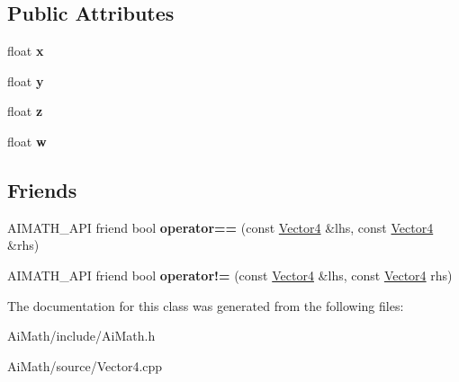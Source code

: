 \subsection*{Public Attributes}
\begin{DoxyCompactItemize}
\item 
\hypertarget{class_ai_math_1_1_vector4_a518497574690c3511c77a9876e179d61}{float {\bfseries x}}\label{class_ai_math_1_1_vector4_a518497574690c3511c77a9876e179d61}

\item 
\hypertarget{class_ai_math_1_1_vector4_ac81198522c850d38d7f765459298ee59}{float {\bfseries y}}\label{class_ai_math_1_1_vector4_ac81198522c850d38d7f765459298ee59}

\item 
\hypertarget{class_ai_math_1_1_vector4_a3e4d29e783b466fec6081c59bee82b3d}{float {\bfseries z}}\label{class_ai_math_1_1_vector4_a3e4d29e783b466fec6081c59bee82b3d}

\item 
\hypertarget{class_ai_math_1_1_vector4_a728127f284281d1fd39a31ff6dba910d}{float {\bfseries w}}\label{class_ai_math_1_1_vector4_a728127f284281d1fd39a31ff6dba910d}

\end{DoxyCompactItemize}
\subsection*{Friends}
\begin{DoxyCompactItemize}
\item 
\hypertarget{class_ai_math_1_1_vector4_a25984ac1dbdff4ae0bca4a990069f911}{A\+I\+M\+A\+T\+H\+\_\+\+A\+P\+I friend bool {\bfseries operator==} (const \hyperlink{class_ai_math_1_1_vector4}{Vector4} \&lhs, const \hyperlink{class_ai_math_1_1_vector4}{Vector4} \&rhs)}\label{class_ai_math_1_1_vector4_a25984ac1dbdff4ae0bca4a990069f911}

\item 
\hypertarget{class_ai_math_1_1_vector4_a5088c44c5df3d2a3a98f484e3b860c0a}{A\+I\+M\+A\+T\+H\+\_\+\+A\+P\+I friend bool {\bfseries operator!=} (const \hyperlink{class_ai_math_1_1_vector4}{Vector4} \&lhs, const \hyperlink{class_ai_math_1_1_vector4}{Vector4} rhs)}\label{class_ai_math_1_1_vector4_a5088c44c5df3d2a3a98f484e3b860c0a}

\end{DoxyCompactItemize}


The documentation for this class was generated from the following files\+:\begin{DoxyCompactItemize}
\item 
Ai\+Math/include/Ai\+Math.\+h\item 
Ai\+Math/source/Vector4.\+cpp\end{DoxyCompactItemize}
